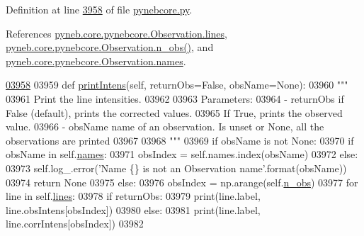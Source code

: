 Definition at line \hyperlink{pynebcore_8py_source_l03958}{3958} of file \hyperlink{pynebcore_8py_source}{pynebcore.\-py}.



References \hyperlink{pynebcore_8py_source_l03542}{pyneb.\-core.\-pynebcore.\-Observation.\-lines}, \hyperlink{pynebcore_8py_source_l03642}{pyneb.\-core.\-pynebcore.\-Observation.\-n\-\_\-obs()}, and \hyperlink{pynebcore_8py_source_l03543}{pyneb.\-core.\-pynebcore.\-Observation.\-names}.


\begin{DoxyCode}
\hypertarget{classpyneb_1_1core_1_1pynebcore_1_1_observation_l03958}{}\hyperlink{classpyneb_1_1core_1_1pynebcore_1_1_observation_aa3d4a178539eaf7fe431ef1dbd347430}{03958} 
03959     \textcolor{keyword}{def }\hyperlink{classpyneb_1_1core_1_1pynebcore_1_1_observation_aa3d4a178539eaf7fe431ef1dbd347430}{printIntens}(self, returnObs=False, obsName=None):
03960         \textcolor{stringliteral}{"""}
03961 \textcolor{stringliteral}{        Print the line intensities.}
03962 \textcolor{stringliteral}{        }
03963 \textcolor{stringliteral}{        Parameters:}
03964 \textcolor{stringliteral}{            - returnObs   if False (default), prints the corrected values. }
03965 \textcolor{stringliteral}{                            If True, prints the observed value. }
03966 \textcolor{stringliteral}{            - obsName     name of an observation. Is unset or None, all the observations are printed}
03967 \textcolor{stringliteral}{}
03968 \textcolor{stringliteral}{        """}    
03969         \textcolor{keywordflow}{if} obsName \textcolor{keywordflow}{is} \textcolor{keywordflow}{not} \textcolor{keywordtype}{None}:
03970             \textcolor{keywordflow}{if} obsName \textcolor{keywordflow}{in} self.\hyperlink{classpyneb_1_1core_1_1pynebcore_1_1_observation_a3f365d0b1488b2eba300bf71caf23c17}{names}:
03971                 obsIndex = self.names.index(obsName)
03972             \textcolor{keywordflow}{else}:
03973                 self.log\_.error(\textcolor{stringliteral}{'Name \{\} is not an Observation name'}.format(obsName))
03974                 \textcolor{keywordflow}{return} \textcolor{keywordtype}{None}
03975         \textcolor{keywordflow}{else}:
03976             obsIndex = np.arange(self.\hyperlink{classpyneb_1_1core_1_1pynebcore_1_1_observation_a3c9122167ef525b73a62d39d4b5c4239}{n\_obs})
03977         \textcolor{keywordflow}{for} line \textcolor{keywordflow}{in} self.\hyperlink{classpyneb_1_1core_1_1pynebcore_1_1_observation_a78332043ca9f290590edf6b8a1e5b767}{lines}:
03978             \textcolor{keywordflow}{if} returnObs:
03979                 print(line.label, line.obsIntens[obsIndex])
03980             \textcolor{keywordflow}{else}:
03981                 print(line.label, line.corrIntens[obsIndex])
03982     
            
\end{DoxyCode}
